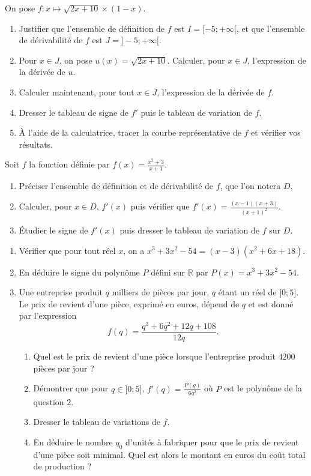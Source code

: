 \documentclass[11pt]{article}
\begin{document}
\begin{exo}[$\star$]
On pose $f:x\mapsto \sqrt{2x+10}\times(1-x)$.
\begin{enumerate}
  \item Justifier que l'ensemble de définition de $f$ est $I=[-5;+\infty[$, et que
    l'ensemble de dérivabilité de $f$ est $J=]-5;+\infty[$.
    \item Pour $x\in J$, on pose $u(x)=\sqrt{2x+10}$. Calculer, pour $x\in J$,
      l'expression de la dérivée de $u$.
    \item Calculer maintenant, pour tout $x\in J$, l'expression de la dérivée de
      $f$.
    \item Dresser le tableau de signe de $f'$ puis le tableau de variation de
      $f$.
    \item À l'aide de la calculatrice, tracer la courbe représentative de $f$ et
      vérifier vos résultats.
\end{enumerate}
\end{exo}

\begin{exo}
Soit $f$ la fonction définie par
$f(x)=\frac{x^2+3}{x+1}$.
\begin{enumerate}
  \item Préciser l'ensemble de définition et de dérivabilité de $f$, que l'on
    notera $D$.
  \item Calculer, pour $x\in D$, $f'(x)$ puis vérifier que $f'(x) =
    \frac{(x-1)(x+3)}{(x+1)^2}$.
  \item Étudier le signe de $f'(x)$ puis dresser le tableau de variation de $f$
    sur $D$.
\end{enumerate}
\end{exo}

\begin{exo}
\begin{enumerate}
  \item Vérifier que pour tout réel $x$, on a $x^3+3x^2-54 = (x-3)(x^2+6x+18)$.
  \item En déduire le signe du polynôme $P$ défini sur $\mathbb{R}$ par
    $P(x)=x^3+3x^2-54$.
  \item Une entreprise produit $q$ milliers de pièces par jour, $q$ étant un
  réel de $]0;5]$. Le prix de revient d'une pièce, exprimé en euros, dépend de
  $q$ et est donné par l'expression
  \[
    f(q) = \frac{q^3+6q^2+12q+108}{12q}.
  \] 
  \begin{enumerate}
    \item Quel est le prix de revient d'une pièce lorsque l'entreprise produit
      $4200$ pièces par jour ?
  \item Démontrer que pour $q\in]0;5]$, $f'(q)=\frac{P(q)}{6q^2}$ où $P$ est le
    polynôme de la question $2$.
  \item Dresser le tableau de variations de $f$.
  \item En déduire le nombre $q_0$ d'unités à fabriquer pour que le prix de
    revient d'une pièce soit minimal. Quel est alors le montant en euros du coût
    total de production ?
  \end{enumerate}
\end{enumerate}
\end{exo}
\end{document}

